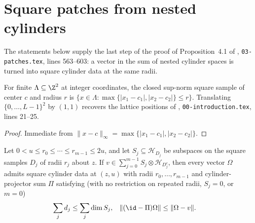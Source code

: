 \section{Square patches from nested cylinders}
\label{sec:peps_adaptive_patch_bridge}
The statements below supply the last step of the proof of
Proposition~4.1 of \cite{OpenAI2026PolynomialPEPS}, \texttt{03-patches.tex},
lines 563--603: a vector in the sum of nested cylinder spaces is turned into
square cylinder data at the same radii.

\begin{lemma}
    \label{thm:peps_square_sample_integer_coordinates}
    \leanok
    For finite $\Lambda\subseteq\Z^2$ at integer coordinates, the closed
    sup-norm square sample of center $c$ and radius $r$ is
    $\{x\in\Lambda:\max\{|x_1-c_1|,|x_2-c_2|\}\le r\}$. Translating
    $\{0,\ldots,L-1\}^2$ by $(1,1)$ recovers the lattice positions of
    \cite{OpenAI2026PolynomialPEPS}, \texttt{00-introduction.tex}, lines 21--25.
\end{lemma}

\begin{proof}
    \leanok
    Immediate from $\|x-c\|_\infty=\max\{|x_1-c_1|,|x_2-c_2|\}$.
\end{proof}

\begin{lemma}
    \label{thm:peps_square_patch_of_nested_cylinders}
    \leanok
    Let $0<u\le r_0\le\cdots\le r_{m-1}\le2u$, and let $S_j\subseteq\mathcal H_{D_j}$
    be subspaces on the square samples $D_j$ of radii $r_j$ about $z$. If
    $v\in\sum_{j=0}^{m-1}S_j\otimes\mathcal H_{D_j^c}$, then every vector
    $\Omega$ admits square cylinder data at $(z,u)$ with radii
    $r_0,\ldots,r_{m-1}$ and cylinder-projector sum $\Pi$ satisfying
    (with no restriction on repeated radii, $S_j=0$, or $m=0$)
    \begin{align}
        \sum_jd_j                   & \le\sum_j\dim S_j,       &
        \lVert(\id-\Pi)\Omega\rVert & \le\lVert\Omega-v\rVert.
        \label{eq:peps_square_patch_nested_cylinders}
    \end{align}
\end{lemma}

